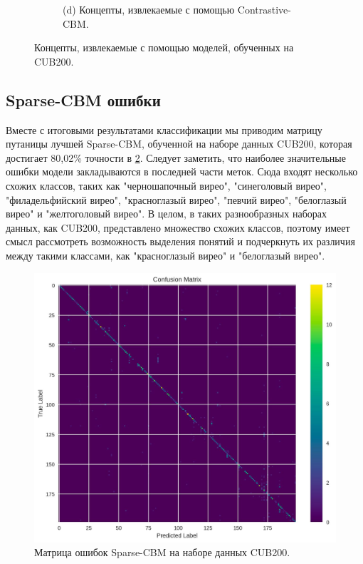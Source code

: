 \begin{figure}[h]
\begin{subfigure}
    \\
    (d) Концепты, извлекаемые с помощью Contrastive-CBM.
    \end{subfigure}
    \caption{Концепты, извлекаемые с помощью моделей, обученных на CUB200.}
    \label{fig:concepts_6}
\end{figure}

\subsection{Sparse-CBM ошибки}
\label{sec:sparse_confusion}
Вместе с итоговыми результатами классификации мы приводим матрицу путаницы лучшей Sparse-CBM, обученной на наборе данных CUB200, которая достигает 80,02\% точности в \cref{fig:cub_conf_matrix}. Следует заметить, что наиболее значительные ошибки модели закладываются в последней части меток. Сюда входят несколько схожих классов, таких как "черношапочный вирео", "синеголовый вирео", "филадельфийский вирео", "красноглазый вирео", "певчий вирео", "белоглазый вирео" и "желтоголовый вирео". В целом, в таких разнообразных наборах данных, как CUB200, представлено множество схожих классов, поэтому имеет смысл рассмотреть возможность выделения понятий и подчеркнуть их различия между такими классами, как "красноглазый вирео" и "белоглазый вирео".

\begin{figure}[t]%
\begin{center}
\centerline{
\includegraphics[width=0.6\columnwidth]{./figures/cub_conf_matrix.jpg}}
\caption{Матрица ошибок Sparse-CBM на наборе данных CUB200.}
\label{fig:cub_conf_matrix}
\end{center}
\end{figure}